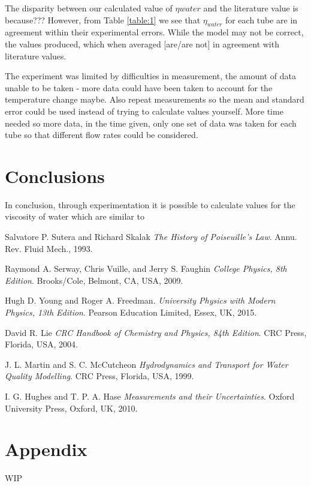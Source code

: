 \documentclass[twocolumn]{revtex4}
\begin{document}
The disparity between our calculated value of $\eta{water}$ and the literature value is because???
However, from Table \ref{table:1} we see that $\eta_{water}$ for each tube are in agreement within their experimental errors. While the model may not be correct, the values produced, which when averaged [are/are not] in agreement with literature values. 

The experiment was limited by difficulties in measurement, the amount of data unable to be taken - more data could have been taken to account for the temperature change maybe. Also repeat measurements so the mean and standard error could be used instead of trying to calculate values yourself. More time needed so more data, in the time given, only one set of data was taken for each tube so that different flow rates could be considered. 

\vspace{-5ex}
\section{Conclusions}
\vspace{-2ex}
 
In conclusion, through experimentation it is possible to calculate values for the viscosity of water which are similar to 

\begin{thebibliography}{5}
	Salvatore P. Sutera and Richard Skalak
	\textit{The History of Poiseuille's Law}.
	Annu. Rev. Fluid Mech., 1993.
	
	Raymond A. Serway, Chris Vuille, and Jerry S. Faughin
	\textit{College Physics, 8th Edition}.
	Brooks/Cole, Belmont, CA, USA, 2009.

	Hugh D. Young and Roger A. Freedman.
	\textit{University Physics with Modern Physics, 13th Edition}. 
	Pearson Education Limited, Essex, UK, 2015.
	
	David R. Lie
	\textit{CRC Handbook of Chemistry and Physics, 84th Edition}. 
	CRC Press, Florida, USA, 2004.
	
	J. L. Martin and S. C. McCutcheon
	\textit{Hydrodynamics and Transport for Water Quality Modelling}. 
	CRC Press, Florida, USA, 1999.
	
	I. G. Hughes and T. P. A. Hase
	\textit{Measurements and their Uncertainties}. 
	Oxford University Press, Oxford, UK, 2010.
	
\end{thebibliography}
\clearpage

\vfill
\twocolumngrid
\vspace{-3ex}
\section*{Appendix}
\vspace{-2ex}

WIP

\clearpage
\end{document}
